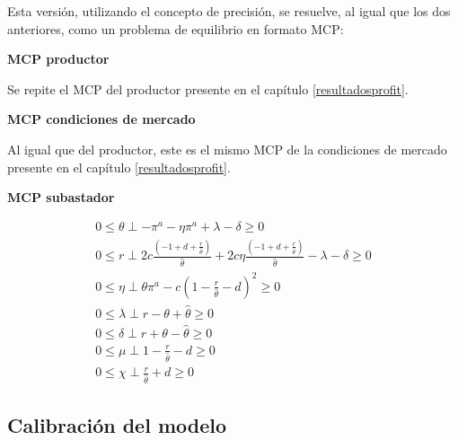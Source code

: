 Esta versión, utilizando el concepto de precisión, se resuelve, al igual que los dos anteriores, como un problema de equilibrio en formato MCP:
\vspace{2.5mm}

\textbf{MCP productor}

Se repite el MCP del productor presente en el capítulo \ref{resultadosprofit}.

\textbf{MCP condiciones de mercado}

Al igual que del productor, este es el mismo MCP de la condiciones de mercado presente en el capítulo \ref{resultadosprofit}.

\textbf{MCP subastador}

\begin{footnotesize}
\begin{align}
    0 \leq \theta \perp -\pi^a   - \eta\pi^a  + \lambda -  \delta \geq 0\\
   0 \leq r \perp 2c\frac{(-1+d+\frac{r}{\hat{\theta}})}{\hat{\theta}} + 2c\eta \frac{(-1+d+\frac{r}{\hat{\theta}})}{\hat{\theta}} - \lambda - \delta  \geq 0\\
0 \leq \eta \perp \theta \pi^a - c(1-\frac{r}{\hat{\theta}}-d)^2 \geq 0 \\
0 \leq \lambda \perp r - \theta + \hat{\theta} \geq 0 \\
0 \leq \delta \perp r + \theta - \hat{\theta} \geq 0\\
0 \leq \mu \perp 1-\frac{r}{\hat{\theta}}-d \geq 0\\
0 \leq\chi \perp \frac{r}{\hat{\theta}} + d \geq 0 
\end{align}
\end{footnotesize}

\subsection{Calibración del modelo}

